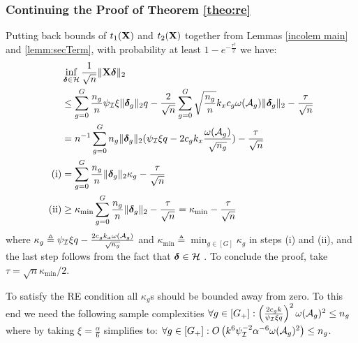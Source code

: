 \subsubsection{Continuing the Proof of Theorem \ref{theo:re}}
Putting back bounds of $t_1(\mathbf{X})$ and $t_2(\mathbf{X})$ together from Lemmas \ref{incolem main} and \ref{lemm:secTerm}, with probability at least $1 - e^{-\frac{\tau^2}{2}}$ we have:
{\small
\begin{align}
\nr 
&\inf_{\ddelta \in \cH} \frac{1}{\sqrt{n}} \norm{\X \ddelta}{2}
\\ \nr
&\leq\sum_{g=0}^{G}  \frac{n_g}{n} \rinc \xi \norm{\ddelta_g}{2} q
- \frac{2}{\sqrt{n}} \sum_{g=0}^{G}  \sqrt{\frac{n_g}{n}} k_x c_g \omega(\cA_g) \norm{\ddelta_{g}}{2} - \frac{\tau }{\sqrt{n}}
\\ \nr
&=n^{-1}\sum_{g=0}^{G} n_g \norm{\ddelta_{g}}{2} ( \rinc \xi  q-2 c_g k_x \frac{\omega(\cA_g)}{\sqrt{n_g}})-\frac{\tau}{\sqrt{n}}
\\ \nr
(\text{i}) &= \sum_{g=0}^{G} \frac{n_g}{n} \norm{\ddelta_g}{2} \kappa_g  - \frac{\tau}{\sqrt{n}}
\\ \nr
(\text{ii}) &\geq \kappa_{\min}\sum_{g=0}^{G} \frac{n_g}{n} \norm{\ddelta_g}{2}  - \frac{\tau}{\sqrt{n}}
= \kappa_{\min}  - \frac{\tau}{\sqrt{n}} %
\end{align}
}where $\kappa_g \triangleq \rinc \xi q  - \frac{2 c_g k_x \omega(\cA_g)}{\sqrt{n_g}}$ and $\kappa_{\min} \triangleq \min_{g\in [G]} \kappa_g$ in steps (i) and (ii), and the last step  follows from the fact that $\ddelta \in \cH$ . To conclude the proof, take $\tau = \sqrt{n} \kappa_{\min}/2$. 

To satisfy the RE condition all $\kappa_g$s should be bounded away from zero.
To this end we need the following sample complexities $\forall g \in [G_+]: \left(\frac{2 c_g k }{\rinc \xi q}\right)^2 \omega(\cA_g)^2 \leq n_g $ where by taking $\xi = \frac{\alpha}{6}$ simplifies to: $\forall g \in [G_+]: O\left(k^6 \rinc^{-2} \alpha^{-6} \omega(\cA_g)^2\right) \leq n_g$. {\qedsymbol}


